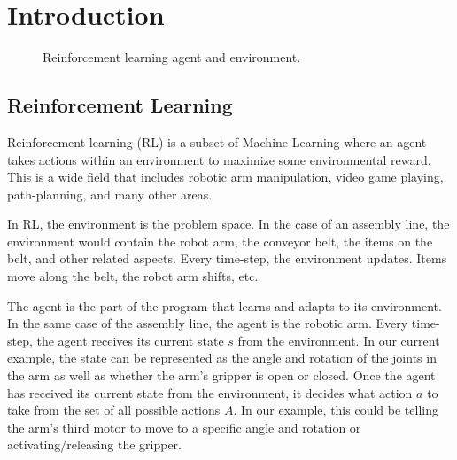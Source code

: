 \documentclass[12pt]{thesis}
\begin{document}


\body


\chapter{Introduction}
\begin{figure}
	\begin{center}
		\scalebox{0.5}{}
	\end{center}
	\caption{Reinforcement learning agent and environment.}
	\label{fig:RLagent}
\end{figure}
\section{Reinforcement Learning}
Reinforcement learning (RL) is a subset of Machine Learning where an agent takes actions within an environment to maximize some environmental reward. \cite{Sutton1998} This is a wide field that includes robotic arm manipulation, video game playing, path-planning, and many other areas.

In RL, the environment is the problem space. In the case of an assembly line, the environment would contain the robot arm, the conveyor belt, the items on the belt, and other related aspects. Every time-step, the environment updates. Items move along the belt, the robot arm shifts, etc.

The agent is the part of the program that learns and adapts to its environment. In the same case of the assembly line, the agent is the robotic arm. Every time-step, the agent receives its current state $s$ from the environment. In our current example, the state can be represented as the angle and rotation of the joints in the arm as well as whether the arm’s gripper is open or closed. Once the agent has received its current state from the environment, it decides what action $a$ to take from the set of all possible actions $A$. In our example, this could be telling the arm’s third motor to move to a specific angle and rotation or activating/releasing the gripper.
\end{document}
